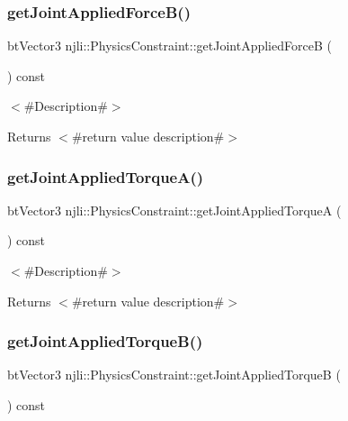 \subsubsection{\texorpdfstring{get\+Joint\+Applied\+Force\+B()}{getJointAppliedForceB()}}
{\footnotesize\ttfamily bt\+Vector3 njli\+::\+Physics\+Constraint\+::get\+Joint\+Applied\+ForceB (\begin{DoxyParamCaption}{ }\end{DoxyParamCaption}) const}

$<$\#\+Description\#$>$

\begin{DoxyReturn}{Returns}
$<$\#return value description\#$>$ 
\end{DoxyReturn}
\mbox{\label{classnjli_1_1_physics_constraint_a4fb1d50043e450fd584d12852a756c79}} 
\subsubsection{\texorpdfstring{get\+Joint\+Applied\+Torque\+A()}{getJointAppliedTorqueA()}}
{\footnotesize\ttfamily bt\+Vector3 njli\+::\+Physics\+Constraint\+::get\+Joint\+Applied\+TorqueA (\begin{DoxyParamCaption}{ }\end{DoxyParamCaption}) const}

$<$\#\+Description\#$>$

\begin{DoxyReturn}{Returns}
$<$\#return value description\#$>$ 
\end{DoxyReturn}
\mbox{\label{classnjli_1_1_physics_constraint_a1df0c51cb5bb8bebbfc4474908df3f74}} 
\subsubsection{\texorpdfstring{get\+Joint\+Applied\+Torque\+B()}{getJointAppliedTorqueB()}}
{\footnotesize\ttfamily bt\+Vector3 njli\+::\+Physics\+Constraint\+::get\+Joint\+Applied\+TorqueB (\begin{DoxyParamCaption}{ }\end{DoxyParamCaption}) const}

